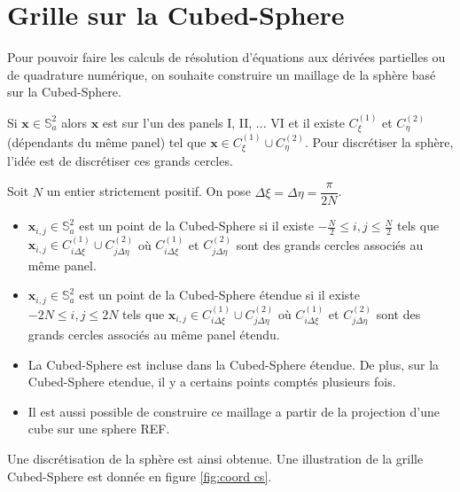 \section{Grille sur la Cubed-Sphere}

Pour pouvoir faire les calculs de résolution d'équations aux dérivées partielles ou de quadrature numérique, on souhaite construire un maillage de la sphère basé sur la Cubed-Sphere.

Si $\mathbf{x} \in \mathbb{S}_a^2$ alors $\mathbf{x}$ est sur l'un des panels I, II, ... VI et il existe $C_{\xi}^{(1)}$ et $C_{\eta}^{(2)}$ (dépendants du même panel) tel que $\mathbf{x} \in C_{\xi}^{(1)} \cup C_{\eta}^{(2)}$. Pour discrétiser la sphère, l'idée est de discrétiser ces grands cercles.

\begin{definition}
Soit $N$ un entier strictement positif. On pose $\Delta \xi = \Delta \eta = \dfrac{\pi}{2N}$.
\begin{itemize}
\item $\mathbf{x}_{i,j} \in \mathbb{S}_a^2$ est un point de la Cubed-Sphere si il existe $-\frac{N}{2} \leq i,j \leq \frac{N}{2}$ tels que $\mathbf{x}_{i,j} \in C_{i \Delta \xi}^{(1)} \cup C_{j \Delta \eta}^{(2)}$ où $C_{i \Delta \xi}^{(1)}$ et $C_{j \Delta \eta}^{(2)}$ sont des grands cercles associés au même panel.

\item $\mathbf{x}_{i,j} \in \mathbb{S}_a^2$ est un point de la Cubed-Sphere étendue si il existe $-2N \leq i,j \leq 2N$ tels que $\mathbf{x}_{i,j} \in C_{i \Delta \xi}^(1) \cup C_{j \Delta \eta}^(2)$ où $C_{i \Delta \xi}^(1)$ et $C_{j \Delta \eta}^(2)$ sont des grands cercles associés au même panel étendu.
\end{itemize}
\end{definition}

\begin{remarque}
\begin{itemize}
\item La Cubed-Sphere est incluse dans la Cubed-Sphere étendue. De plus, sur la Cubed-Sphere etendue, il y a certains points comptés plusieurs fois.
\item Il est aussi possible de construire ce maillage a partir de la projection d'une cube sur une sphere REF.
\end{itemize}
\end{remarque}

Une discrétisation de la sphère est ainsi obtenue. Une illustration de la grille Cubed-Sphere est donnée en figure \ref{fig:coord cs}.

